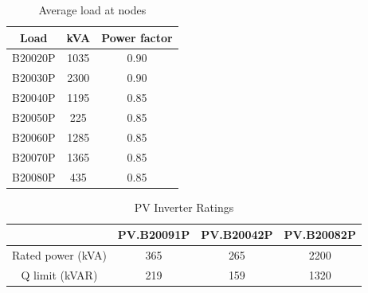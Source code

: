 \begin{table}[!h]
\caption{Average load at nodes}
\label{tab:load_data}
\centering
\begin{tabular}{|c|c|c|}
\hline
Load & kVA & Power factor \\ \hline
B20020P & 1035 & 0.90 \\ \hline
B20030P & 2300 & 0.90 \\ \hline
B20040P & 1195 & 0.85 \\ \hline
B20050P & 225 & 0.85 \\ \hline
B20060P & 1285 & 0.85 \\ \hline
B20070P & 1365 & 0.85 \\ \hline
B20080P & 435 & 0.85 \\ \hline
\end{tabular}
\end{table}


\begin{table}[!h]
\centering
\caption{PV Inverter Ratings}
\label{tab:Inv_rate}
\begin{tabular}{c|c|c|c|}
\cline{2-4}
 & PV.B20091P & PV.B20042P & PV.B20082P \\ \hline
\multicolumn{1}{|c|}{Rated power (kVA)} & 365 & 265 & 2200 \\ \hline
\multicolumn{1}{|c|}{Q limit (kVAR)} & 219 & 159 & 1320 \\ \hline
\end{tabular}
\end{table}
